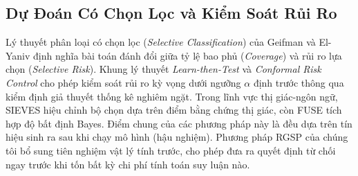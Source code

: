\subsection{Dự Đoán Có Chọn Lọc và Kiểm Soát Rủi Ro}
Lý thuyết phân loại có chọn lọc (\textit{Selective Classification}) của Geifman và El-Yaniv \cite{geifman2017selective} định nghĩa bài toán đánh đổi giữa tỷ lệ bao phủ (\textit{Coverage}) và rủi ro lựa chọn (\textit{Selective Risk}). Khung lý thuyết \textit{Learn-then-Test} \cite{angelopoulos2021learn} và \textit{Conformal Risk Control} \cite{angelopoulos2024conformal} cho phép kiểm soát rủi ro kỳ vọng dưới ngưỡng $\alpha$ định trước thông qua kiểm định giả thuyết thống kê nghiêm ngặt. Trong lĩnh vực thị giác-ngôn ngữ, SIEVES \cite{sieves2024} hiệu chỉnh bộ chọn dựa trên điểm bằng chứng thị giác, còn FUSE tích hợp độ bất định Bayes. Điểm chung của các phương pháp này là đều dựa trên tín hiệu sinh ra sau khi chạy mô hình (hậu nghiệm). Phương pháp RGSP của chúng tôi bổ sung tiên nghiệm vật lý tính trước, cho phép đưa ra quyết định từ chối ngay trước khi tốn bất kỳ chi phí tính toán suy luận nào.

\begin{table}[t]
\centering
\caption{Định vị phương pháp RGSP so với các công trình liên quan.}
\label{tab:positioning}
\end{table}
